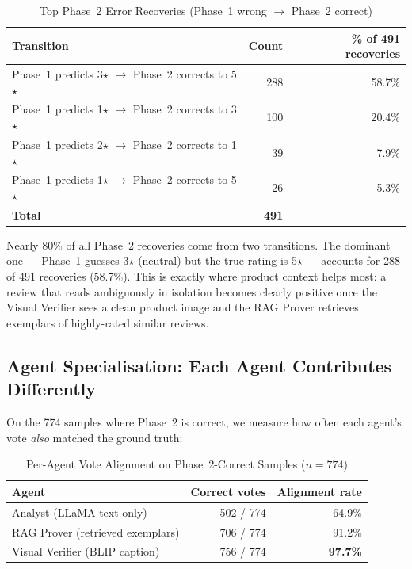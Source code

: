 \documentclass[12pt,a4paper]{article}
\begin{document}
\begin{table}[H]
\centering
\caption{Top Phase~2 Error Recoveries (Phase~1 wrong $\to$ Phase~2 correct)}
\begin{tabular}{lrr}
\toprule
\textbf{Transition} & \textbf{Count} & \textbf{\% of 491 recoveries} \\
\midrule
Phase~1 predicts 3$\star$ $\to$ Phase~2 corrects to 5$\star$ & 288 & 58.7\% \\
Phase~1 predicts 1$\star$ $\to$ Phase~2 corrects to 3$\star$ & 100 & 20.4\% \\
Phase~1 predicts 2$\star$ $\to$ Phase~2 corrects to 1$\star$ &  39 &  7.9\% \\
Phase~1 predicts 1$\star$ $\to$ Phase~2 corrects to 5$\star$ &  26 &  5.3\% \\
\midrule
\textbf{Total} & \textbf{491} & \\
\bottomrule
\end{tabular}
\end{table}

\noindent Nearly 80\% of all Phase~2 recoveries come from two transitions. The dominant
one --- Phase~1 guesses 3$\star$ (neutral) but the true rating is 5$\star$ --- accounts
for 288 of 491 recoveries (58.7\%). This is exactly where product context helps most: a
review that reads ambiguously in isolation becomes clearly positive once the Visual Verifier
sees a clean product image and the RAG Prover retrieves exemplars of highly-rated similar
reviews.

\subsection{Agent Specialisation: Each Agent Contributes Differently}

On the 774 samples where Phase~2 is correct, we measure how often each agent's vote
\emph{also} matched the ground truth:

\begin{table}[H]
\centering
\caption{Per-Agent Vote Alignment on Phase~2-Correct Samples ($n=774$)}
\begin{tabular}{lrr}
\toprule
\textbf{Agent} & \textbf{Correct votes} & \textbf{Alignment rate} \\
\midrule
Analyst (LLaMA text-only)         & 502 / 774 & 64.9\% \\
RAG Prover (retrieved exemplars)  & 706 / 774 & 91.2\% \\
Visual Verifier (BLIP caption)    & 756 / 774 & \textbf{97.7\%} \\
\bottomrule
\end{tabular}
\end{table}
\end{document}
